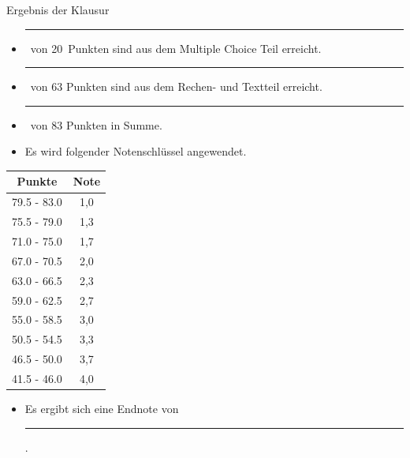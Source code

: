 \documentclass[a4paper, 10pt]{scrartcl}\usepackage[]{graphicx}\usepackage[]{xcolor}
\begin{document}
\begin{graybox}{Ergebnis der Klausur}
  \vspace{1Ex}
  \begin{itemize}
  \item[] \rule[0ex]{3em}{.4pt}\, von 20\, Punkten sind aus dem Multiple
    Choice Teil erreicht.
  \item[] \rule[0ex]{3em}{.4pt}\, von 63 Punkten sind aus dem Rechen- und
    Textteil erreicht. 
  \item[] \rule[0ex]{3em}{.4pt}\, von 83 Punkten in Summe.
  \item[] Es wird folgender Notenschl{\"u}ssel angewendet.   
  \end{itemize}
  \vspace{1ex}
\begin{center}
  \begin{tabular}[c]{cc}
    \toprule
    \textbf{Punkte}	&	\textbf{Note}	\\
    \midrule
    79.5 - 83.0	&	1,0	\\
    75.5 - 79.0	&	1,3	\\
    71.0 - 75.0	&	1,7	\\
    67.0 - 70.5	&	2,0	\\
    63.0 - 66.5	&	2,3	\\
    59.0 - 62.5	&	2,7	\\
    55.0 - 58.5	&	3,0	\\
    50.5 - 54.5	&	3,3	\\
    46.5 - 50.0	&	3,7	\\
    41.5 - 46.0	&	4,0	\\
    \bottomrule
  \end{tabular}
\end{center}
  \vspace{1ex}
\begin{itemize}
\item[] Es ergibt sich eine Endnote von \rule[0ex]{4em}{.4pt}.
\end{itemize}
  \vspace{1Ex}
\end{graybox}

\newpage
\end{document}
